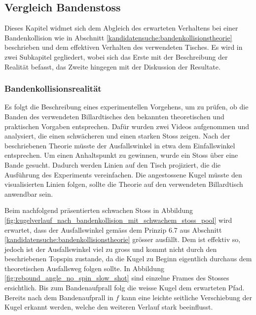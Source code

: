 \newpage
\subsection{Vergleich Bandenstoss}
Dieses Kapitel widmet sich dem Abgleich des erwarteten Verhaltens bei einer Bandenkollision wie in
Abschnitt \ref{kandidatensuche:bandenkollisionstheorie} beschrieben und dem effektiven Verhalten des verwendeten Tisches.
Es wird in zwei Subkapitel gegliedert, wobei sich das Erste mit der Beschreibung der Realität befasst, das Zweite hingegen
mit der Diskussion der Resultate.

\subsubsection{Bandenkollisionsrealität}
Es folgt die Beschreibung eines experimentellen Vorgehens, um zu prüfen, ob die Banden des verwendeten Billardtisches den
bekannten theoretischen und praktischen Vorgaben entsprechen. Dafür wurden zwei Videos aufgenommen und analysiert,
die einen schwächeren und einen starken Stoss zeigen.
Nach der beschriebenen Theorie müsste der Ausfallswinkel in etwa dem Einfallswinkel entsprechen.
Um einen Anhaltspunkt zu gewinnen, wurde ein Stoss
über eine Bande gesucht. Dadurch werden Linien auf den Tisch projiziert, die die Ausführung des Experiments vereinfachen.
Die angestossene Kugel müsste den visualisierten Linien folgen, sollte die Theorie auf den verwendeten Billardtisch
anwendbar sein.

Beim nachfolgend präsentierten schwachen Stoss in Abbildung \ref{fig:kugelverlauf_nach_bandenkollision_mit_schwachem_stoss_pool} wird erwartet, dass der Ausfallswinkel gemäss dem Prinzip 6.7 aus
Abschnitt \ref{kandidatensuche:bandenkollisionstheorie} grösser ausfällt. Dem ist effektiv so, jedoch ist
der Ausfallswinkel viel zu gross und kommt nicht durch den beschriebenen Topspin zustande, da die Kugel zu Beginn
eigentlich durchaus dem theoretischen Ausfallsweg folgen sollte. In Abbildung \ref{fig:rebound_angle_no_spin_slow_shot} sind
einzelne Frames des Stosses ersichtlich. Bis zum Bandenaufprall folg die weisse Kugel dem erwarteten Pfad. Bereits nach
dem Bandenaufprall in $f$ kann eine leichte seitliche Verschiebung der Kugel erkannt werden, welche den weiteren Verlauf
stark beeinflusst.


